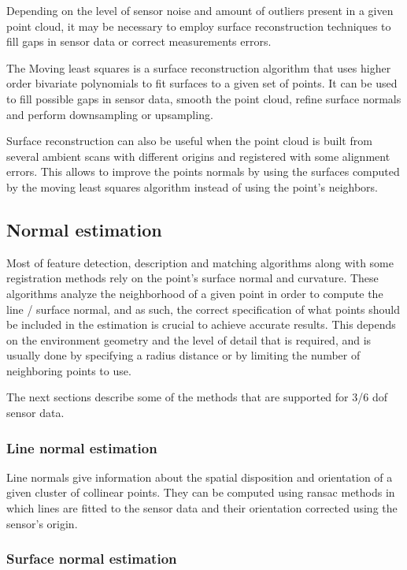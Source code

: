 Depending on the level of sensor noise and amount of outliers present in a given point cloud, it may be necessary to employ surface reconstruction techniques to fill gaps in sensor data or correct measurements errors.

The Moving least squares \cite{Alexa2003} is a surface reconstruction algorithm that uses higher order bivariate polynomials to fit surfaces to a given set of points. It can be used to fill possible gaps in sensor data, smooth the point cloud, refine surface normals and perform downsampling or upsampling.

Surface reconstruction can also be useful when the point cloud is built from several ambient scans with different origins and registered with some alignment errors. This allows to improve the points normals by using the surfaces computed by the moving least squares algorithm instead of using the point's neighbors.


\subsection{Normal estimation}

Most of feature detection, description and matching algorithms along with some registration methods rely on the point's surface normal and curvature. These algorithms analyze the neighborhood of a given point in order to compute the line / surface normal, and as such, the correct specification of what points should be included in the estimation is crucial to achieve accurate results. This depends on the environment geometry and the level of detail that is required, and is usually done by specifying a radius distance or by limiting the number of neighboring points to use.

The next sections describe some of the methods that are supported for 3/6 \gls{dof} sensor data.


\subsubsection{Line normal estimation}

Line normals give information about the spatial disposition and orientation of a given cluster of collinear points. They can be computed using \gls{ransac} methods \cite{Fischler1981} in which lines are fitted to the sensor data and their orientation corrected using the sensor's origin.


\subsubsection{Surface normal estimation}

